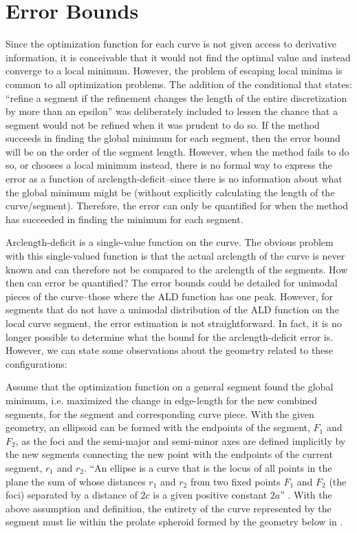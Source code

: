 \section{Error Bounds}
Since the optimization function for each curve is not given access to 
derivative information, it is conceivable that it would not find the 
optimal value and instead converge to a local minimum.  However, the 
problem of escaping local minima is common to all optimization problems.  
The addition of the conditional that states: ``refine a segment if the 
refinement changes the length of the entire discretization by more than an 
epsilon'' was deliberately included to lessen the chance that a segment 
would not be refined when it was prudent to do so.  If the method succeeds 
in finding the global minimum for each segment, then the error bound will 
be on the order of the segment length.  However, when the method fails to 
do so, or chooses a local minimum instead, there is no formal way to 
express the error as a function of arclength-deficit--since there is no 
information about what the global minimum might be (without explicitly 
calculating the length of the curve/segment).  Therefore, the error can 
only be quantified for when the method has succeeded in finding the 
minimum for each segment.

Arclength-deficit is a single-value function on the curve.  The obvious 
problem with this single-valued function is that the actual arclength of 
the curve is never known and can therefore not be compared to the 
arclength of the segments.  How then can error be quantified? The error 
bounds could be detailed for unimodal pieces of the curve--those where the 
ALD function has one peak.  However, for segments that do not have a 
unimodal distribution of the ALD function on the local curve segment, the 
error estimation is not straightforward.  In fact, it is no longer 
possible to determine what the bound for the arclength-deficit error is.  
However, we can state some observations about the geometry related to 
these configurations:

Assume that the optimization function on a general segment found the global minimum, i.e. maximized the change in edge-length for the new combined segments, for the segment and corresponding curve piece.  With the given geometry, an ellipsoid can be formed with the endpoints of the segment, $F_1$ and $F_2$, as the foci and the semi-major and semi-minor axes are defined implicitly by the new segments connecting the new point with the endpoints of the current segment, $r_1$ and $r_2$.  ``An ellipse is a curve that is the locus of all points in the plane the sum of whose distances $r_1$ and $r_2$ from two fixed points $F_1$ and $F_2$ (the foci) separated by a distance of $2c$ is a given positive constant $2a$'' \cite{weissteine}.  With the above assumption and definition, the entirety of the curve represented by the segment must lie within the prolate spheroid  formed by the geometry below in .

